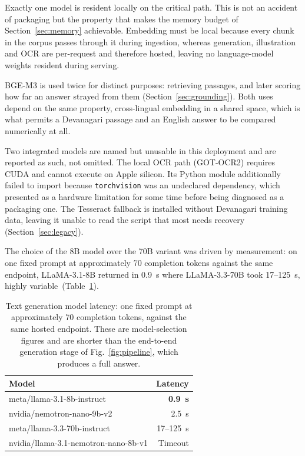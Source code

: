 \ifshort\else  %
Exactly one model is resident locally on the critical path. This is not an accident of packaging but the property that makes the memory budget of Section~\ref{sec:memory} achievable. Embedding must be local because every chunk in the corpus passes through it during ingestion, whereas generation, illustration and OCR are per-request and therefore hosted, leaving no language-model weights resident during serving.
\fi

BGE-M3 is used twice for distinct purposes: retrieving passages, and later scoring how far an answer strayed from them (Section~\ref{sec:grounding}). Both uses depend on the same property, cross-lingual embedding in a shared space, which is what permits a Devanagari passage and an English answer to be compared numerically at all.

\ifshort\else  %
Two integrated models are named but unusable in this deployment and are reported as such, not omitted. The local OCR path (GOT-OCR2) requires CUDA and cannot execute on Apple silicon. Its Python module additionally failed to import because \texttt{torchvision} was an undeclared dependency, which presented as a hardware limitation for some time before being diagnosed as a packaging one. The Tesseract fallback is installed without Devanagari training data, leaving it unable to read the script that most needs recovery (Section~\ref{sec:legacy}).
\fi

The choice of the 8B model over the 70B variant was driven by measurement\ifconf: on one fixed prompt at approximately 70 completion tokens against the same endpoint, LLaMA-3.1-8B returned in 0.9~s where LLaMA-3.3-70B took 17--125~s, highly variable\else\ (Table~\ref{tab:latency})\fi.

\ifconf\else  %
\begin{table}
\caption{Text generation model latency: one fixed prompt at approximately 70 completion tokens, against the same hosted endpoint. These are model-selection figures and are shorter than the end-to-end generation stage of Fig.~\ref{fig:pipeline}, which produces a full answer.}
\label{tab:latency}
\centering
\begin{tabular}{@{}lr@{}}
\toprule
\textbf{Model} & \textbf{Latency} \\
\midrule
meta/llama-3.1-8b-instruct & \textbf{0.9~s} \\
nvidia/nemotron-nano-9b-v2 & 2.5~s \\
meta/llama-3.3-70b-instruct & 17--125~s \\
nvidia/llama-3.1-nemotron-nano-8b-v1 & Timeout \\
\bottomrule
\end{tabular}
\end{table}
\fi

